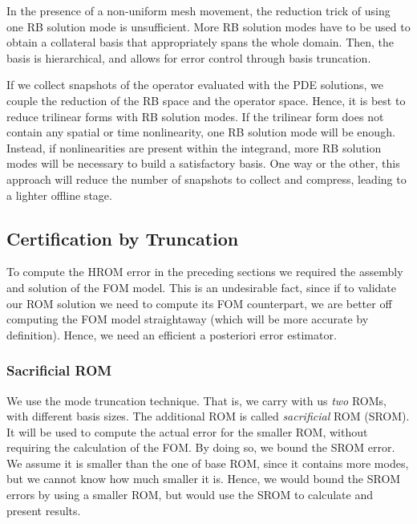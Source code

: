\documentclass[../../thesis.tex]{subfiles}
\begin{document}
In the presence of a non-uniform mesh movement,
the reduction trick of using one RB solution mode is unsufficient.
More RB solution modes have to be used to obtain 
a collateral basis that appropriately spans the whole domain.
Then, the basis is hierarchical, 
and allows for error control through basis truncation.

If we collect snapshots of the operator evaluated with the PDE solutions,
we couple the reduction of the RB space and the operator space.
Hence, it is best to reduce trilinear forms with RB solution modes.
If the trilinear form does not contain any spatial or time nonlinearity, 
one RB solution mode will be enough.
Instead, if nonlinearities are present within the integrand, more RB solution modes will be necessary 
to build a satisfactory basis.
One way or the other, this approach will reduce the number of snapshots to collect and compress,
leading to a lighter offline stage.

\newpage
\subsection{Certification by Truncation}
\label{sec:hrom_results_posteriori_error_estimation}
To compute the HROM error in the preceding sections
we required the assembly and solution of the FOM model.
This is an undesirable fact, since if to validate our ROM solution
we need to compute its FOM counterpart, 
we are better off computing the FOM model straightaway
(which will be more accurate by definition).
Hence, we need an efficient a posteriori error estimator.

\subsubsection{Sacrificial ROM}
We use the mode truncation technique.
That is, we carry with us \textit{two} ROMs,
with different basis sizes.
The additional ROM is called \textit{sacrificial} ROM (SROM).
It will be used to compute the actual error for the smaller ROM,
without requiring the calculation of the FOM.
By doing so, we bound the SROM error.
We assume it is smaller than the one of base ROM, since it contains more modes,
but we cannot know how much smaller it is.
Hence, we would bound the SROM errors by using a smaller ROM, 
but would use the SROM to calculate and present results.
\end{document}
